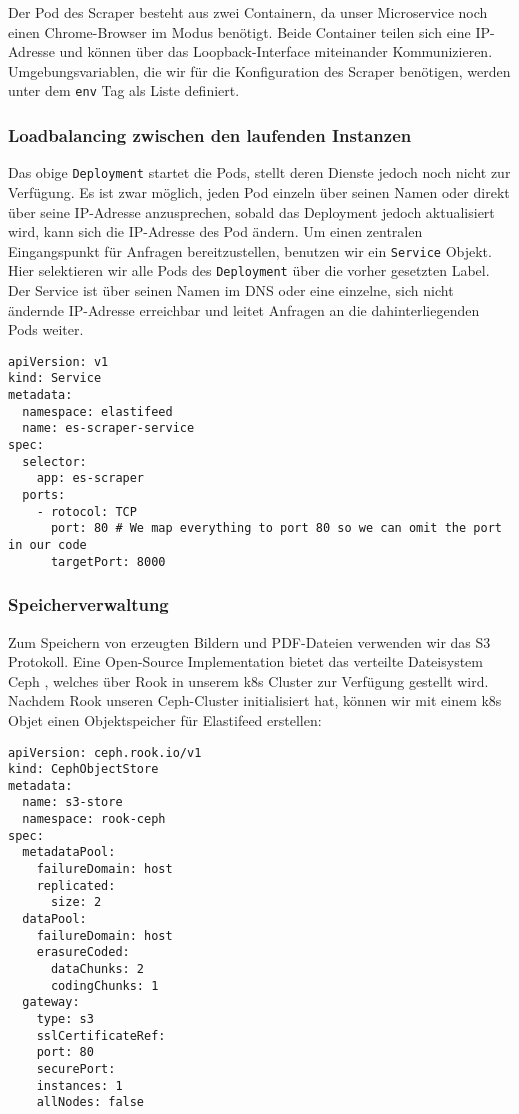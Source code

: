 Der Pod des Scraper besteht aus zwei Containern, da unser Microservice noch einen Chrome-Browser im  Modus benötigt.
Beide Container teilen sich eine IP-Adresse und können über das Loopback-Interface miteinander Kommunizieren.
Umgebungsvariablen, die wir für die Konfiguration des Scraper benötigen, werden unter dem \texttt{env} Tag als Liste definiert.

\subsubsection{Loadbalancing zwischen den laufenden Instanzen}
Das obige \texttt{Deployment} startet die Pods, stellt deren Dienste jedoch noch nicht zur Verfügung.
Es ist zwar möglich, jeden Pod einzeln über seinen Namen oder direkt über seine IP-Adresse anzusprechen, sobald das Deployment jedoch aktualisiert wird, kann sich die IP-Adresse des Pod ändern.
Um einen zentralen Eingangspunkt für Anfragen bereitzustellen, benutzen wir ein \texttt{Service} Objekt.
Hier selektieren wir alle Pods des \texttt{Deployment} über die vorher gesetzten Label.
Der Service ist über seinen Namen im DNS oder eine einzelne, sich nicht ändernde IP-Adresse erreichbar und leitet Anfragen an die dahinterliegenden Pods weiter.

\begin{verbatim}
apiVersion: v1
kind: Service
metadata:
  namespace: elastifeed
  name: es-scraper-service
spec:
  selector:
    app: es-scraper
  ports:
    - rotocol: TCP
      port: 80 # We map everything to port 80 so we can omit the port in our code
      targetPort: 8000
\end{verbatim}

\subsubsection{Speicherverwaltung}
Zum Speichern von erzeugten Bildern und PDF-Dateien verwenden wir das S3 Protokoll.
Eine Open-Source Implementation bietet das verteilte Dateisystem Ceph \cite{ceph}, welches über Rook \cite{rook} in unserem \ac{k8s} Cluster zur Verfügung gestellt wird.
Nachdem Rook unseren Ceph-Cluster initialisiert hat, können wir mit einem \ac{k8s} Objet einen Objektspeicher für Elastifeed erstellen:

\begin{verbatim}
apiVersion: ceph.rook.io/v1
kind: CephObjectStore
metadata:
  name: s3-store
  namespace: rook-ceph
spec:
  metadataPool:
    failureDomain: host
    replicated:
      size: 2
  dataPool:
    failureDomain: host
    erasureCoded:
      dataChunks: 2
      codingChunks: 1
  gateway:
    type: s3
    sslCertificateRef:
    port: 80
    securePort:
    instances: 1
    allNodes: false
\end{verbatim}

